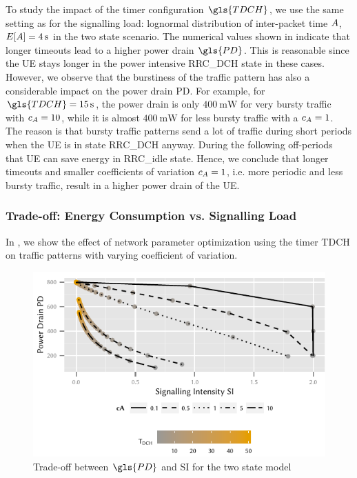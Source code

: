 To study the impact of the timer configuration \(\gls{TDCH}\), we use the same setting as for the signalling load: lognormal distribution of inter-packet time \(A\), \(E[A] = \SI{4}{\second}\) in the two state scenario.
The numerical values shown in  indicate that longer timeouts lead to a higher power drain \(\gls{PD}\).
This is reasonable since the UE stays longer in the power intensive \gls{RRC_DCH} state in these cases.
However, we observe that the burstiness of the traffic pattern has also a considerable impact on the power drain \gls{PD}. 
For example, for \(\gls{TDCH} = \SI{15}{\second}\), the power drain is only \(\SI{400}{\milli\watt}\) for very bursty traffic with \(c_{A} = 10\), while it is almost \(\SI{400}{\milli\watt}\) for less bursty traffic with a \(c_{A} = 1\). 
The reason is that bursty traffic patterns send a lot of traffic during short periods when the UE is in state \gls{RRC_DCH} anyway. During the following off-periods that \gls{UE} can save energy in \gls{RRC_idle} state.
Hence, we conclude that longer timeouts and smaller coefficients of variation \(c_{A} = 1\), i.e. more periodic and less bursty traffic, result in a higher power drain of the \gls{UE}.

\subsubsection*{Trade-off: Energy Consumption vs. Signalling Load}\label{sec:network:performance_model:trade_off}
In , we show the effect of network parameter optimization using the timer \gls{TDCH} on traffic patterns with varying coefficient of variation.

\begin{figure}
	\centering
	\includegraphics{network/performance_model/numerical_examples/figures/2state_pd_vs_si_vs_tdch}
	\caption{Trade-off between \(\gls{PD}\) and \gls{SI} for the two state model}
	\label{fig:network:performance_model:numerical_examples:validations:analytic_vs_simulation:2state_pd_vs_si_vs_tdch}
\end{figure}

